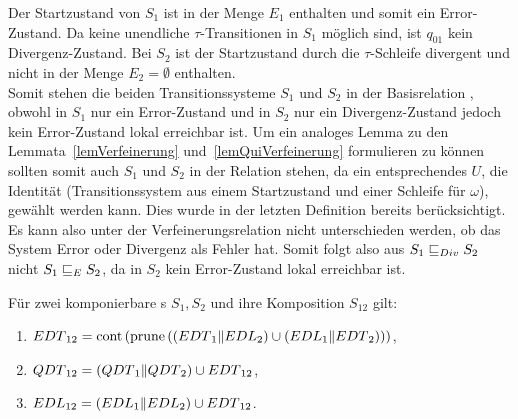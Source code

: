 Der Startzustand von $S_1$ ist in der Menge $E_1$ enthalten und somit ein
Error-Zustand. Da keine unendliche $\tau$-Transitionen in $S_1$ möglich sind,
ist $q_{01}$ kein Divergenz-Zustand. Bei $S_2$ ist der Startzustand durch
die $\tau$-Schleife divergent und nicht in der Menge $E_2=\emptyset$
enthalten.\\
Somit stehen die beiden Transitionssysteme $S_1$ und $S_2$ in der
Basisrelation \DBRel{}, obwohl in $S_1$ nur ein Error-Zustand und in $S_2$ nur
ein Divergenz-Zustand jedoch kein Error-Zustand lokal erreichbar ist. Um ein analoges Lemma zu den
Lemmata~\ref{lemVerfeinerung} und~\ref{lemQuiVerfeinerung} formulieren zu
können sollten somit auch $S_1$ und $S_2$ in der Relation \DRel{} stehen, da
ein entsprechendes $U$, die Identität (Transitionssystem aus einem
Startzustand und einer Schleife für $\omega$), gewählt werden kann. Dies
wurde in der letzten Definition bereits berücksichtigt. Es
kann also unter der Verfeinerungsrelation \DRel{} nicht unterschieden
werden, ob das System Error oder Divergenz als Fehler hat. Somit folgt also aus
$S_1\sqsubseteq _{Div}{} S_2$ nicht $S_1\sqsubseteq _E{} S_2$, da in $S_2$ kein Error-Zustand lokal
erreichbar ist.


\begin{satz}
\label{satzDivSemantik}
  Für zwei komponierbare \EIO{}s $S_1, S_2$ und ihre Komposition
  $S_{12}$ gilt:
  \begin{enumerate}
    \item $EDT{}_{12}=\mathrm{cont} \left(\mathrm{prune} \left(\left(EDT{}_1\|EDL{}_2\right)\cup
      \left(EDL{}_1\|EDT{}_2\right)\right)\right)$,
    \item $QDT{}_{12}=(QDT{}_1\|QDT{}_2)\cup EDT{}_{12}$,
    \item $EDL{}_{12}=(EDL{}_1\|EDL{}_2)\cup EDT{}_{12}$.
  \end{enumerate}
\end{satz}

